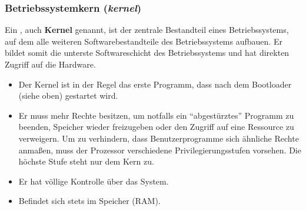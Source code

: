 



\subsubsection{Betriebssystemkern (\textit{kernel})}
Ein , auch \textbf{Kernel} genannt, ist der zentrale Bestandteil eines Betriebssystems, auf dem alle weiteren Softwarebestandteile des Betriebssystems aufbauen. Er bildet somit die unterste Softwareschicht des Betriebssystems und hat direkten Zugriff auf die Hardware.
\begin{itemize}
	\item Der Kernel ist in der Regel das erste Programm, dass nach dem Bootloader (siehe oben) gestartet wird.
	\item Er muss mehr Rechte besitzen, um notfalls ein ``abgestürztes'' Programm zu
	beenden, Speicher wieder freizugeben oder den Zugriff auf eine Ressource zu verweigern. Um zu verhindern, dass Benutzerprogramme sich ähnliche Rechte anmaßen,
	muss der Prozessor verschiedene Privilegierungsstufen vorsehen. Die höchste Stufe
	steht nur dem Kern zu.
	\item Er hat völlige Kontrolle über das System.
	\item Befindet sich stets im Speicher (RAM).
\end{itemize}


